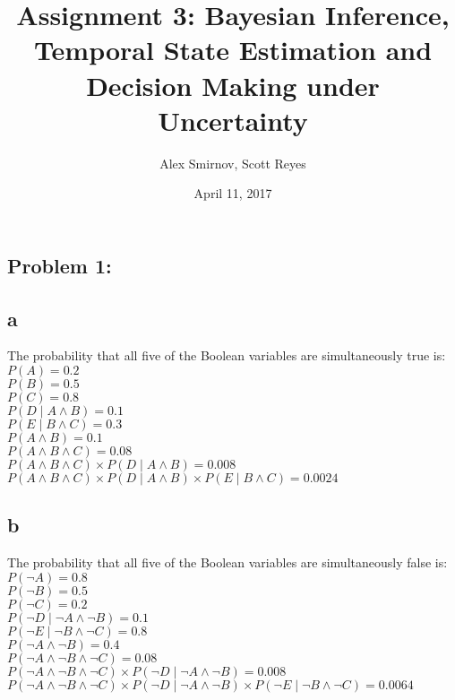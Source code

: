 \documentclass[11pt, oneside]{article}   	%
\title{Assignment 3: Bayesian Inference, Temporal State Estimation and Decision Making under Uncertainty}
\author{Alex Smirnov, Scott Reyes}
\date{April 11, 2017}							%
\begin{document}
\maketitle
\begin{flushleft}

\section*{Problem 1:}
\subsection*{a}
The probability that all five of the Boolean variables are simultaneously true is:\\

$P(A)=0.2$\\
$P(B)=0.5$\\
$P(C)=0.8$\\
$P(D \mid A \wedge B)=0.1$\\
$P(E \mid B \wedge C)=0.3$\\ 
$P(A \wedge B)=0.1$\\
$P(A \wedge B \wedge C)=0.08$\\
$P(A \wedge B \wedge C)\times P(D \mid A \wedge B)=0.008$\\
$P(A \wedge B \wedge C)\times P(D \mid A \wedge B) \times P(E \mid B \wedge C)=0.0024$\\
\subsection*{b}
The probability that all five of the Boolean variables are simultaneously false is:\\
$P(\neg A)=0.8$\\
$P(\neg B)=0.5$\\
$P(\neg C)=0.2$\\
$P(\neg D \mid \neg A \wedge \neg B)=0.1$\\
$P(\neg E \mid \neg B \wedge \neg C)=0.8$\\
$P(\neg A \wedge \neg B)=0.4$\\
$P(\neg A \wedge \neg B \wedge \neg C)=0.08$\\
$P(\neg A \wedge \neg B \wedge \neg C) \times P( \neg D \mid \neg A \wedge \neg B)=0.008$\\
$P(\neg A \wedge \neg B \wedge \neg C)\times P(\neg D \mid \neg A \wedge \neg B) \times P(\neg E \mid \neg B \wedge \neg C)=0.0064$\\

\end{flushleft}
\end{document}

